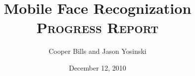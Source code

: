 \documentclass[11pt,letterpaper]{article}
\title{Mobile Face Recognization\\
\textsc{\normalsize Progress Report}}
\author{Cooper Bills and Jason Yosinski \\
\code{\{csb88,jy495\}@cornell.edu}}
\date{December 12, 2010}
\begin{document}
\maketitle

\begin{abstract}

\end{abstract}









\end{document}
